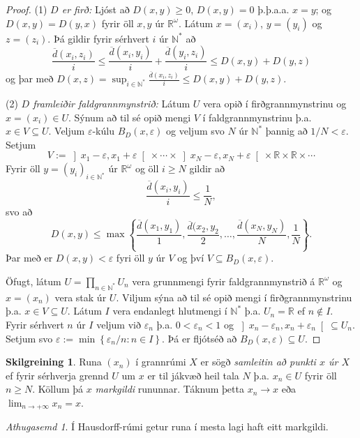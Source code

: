 \documentclass[a4paper,icelandic]{book}
\theoremstyle{definition}
\newtheorem{skilgr}{Skilgreining}[section]
\theoremstyle{plain}
\theoremstyle{remark}
\newtheorem*{ath}{Athugasemd}
\newcommand{\R}{\mathbb{R}} %
\newcommand{\N}{\mathbb{N}} %
\begin{document}
\begin{proof}
  (1) \emph{$D$ er firð:} Ljóst að $D(x,y)\geq 0$, $D(x,y)=0$ þ.þ.a.a.
  $x= y$; og $D(x,y) = D(y,x)$ fyrir öll $x,y$ úr $\R^\omega$. Látum $x =
  (x_i)$, $y=(y_i)$ og $z=(z_i)$. Þá gildir fyrir sérhvert $i$ úr $\N^*$ að\[
  \frac{\overline d(x_i,z_i)}{i}
  \leq \frac{\overline d(x_i,y_i)}{i} + \frac{\overline d(y_i,z_i)}{i}
  \leq D(x,y)+D(y,z)
  \]
  og þar með $D(x,z) = \sup_{i\in\N^*}\frac{\overline d(x_i,z_i)}{i}\leq
  D(x,y)+D(y,z)$.

  (2) \emph{$D$ framleiðir faldgrannmynstrið:} Látum $U$ vera opið í
  firðgrannmynstrinu og $x=(x_i)\in U$. Sýnum að til sé opið mengi $V$ í
  faldgrannmynstrinu þ.a. $x\in V\subseteq U$. Veljum $\varepsilon$-kúlu
  $B_D(x,\varepsilon)$ og veljum svo $N$ úr $\N^*$ þannig að $1/N<\varepsilon$.
  Setjum \[
  V := \left] x_1-\varepsilon,x_1+\varepsilon \right[\times\cdots\times\left]
  x_N-\varepsilon,x_N+\varepsilon \right[\times\R\times\R\times\cdots
  \]
  Fyrir öll $y = (y_i)_{i\in\N^*}$ úr $\R^\omega$ og öll $i\geq N$ gildir að
  \[
  \frac{\overline d(x_i,y_i)}{i}\leq \frac 1N,
  \]
  svo að\[
  D(x,y) \leq\max\left\{ \frac{\overline d(x_1,y_1)}{1}, \frac{\overline
  d(x_2,y_2}{2},\dots,\frac{\overline d(x_N,y_N)}{N}, \frac{1}{N} \right\}.
  \]
  Þar með er $D(x,y)<\varepsilon$ fyri öll $y$ úr $V$ og því $V\subseteq
  B_D(x,\varepsilon)$.

  Öfugt, látum $U = \prod_{n\in\N^*}U_n$ vera grunnmengi fyrir faldgrannmynstrið
  á $\R^\omega$ og $x = (x_n)$ vera stak úr $U$. Viljum sýna að til sé opið
  mengi í firðgrannmynstrinu þ.a. $x\in V\subseteq U$. Látum $I$ vera endanlegt
  hlutmengi í $\N^*$ þ.a. $U_n = \R$ ef $n\notin I$. Fyrir sérhvert $n$ úr
  $I$ veljum við $\varepsilon_n$ þ.a. $0<\varepsilon_n<1$ og 
  $\left] x_n-\varepsilon_n,x_n+\varepsilon_n \right[\subseteq U_n$. Setjum svo
  $\varepsilon := \min\left\{ \varepsilon_n/n : n\in I \right\}$. Þá er fljótséð
  að $B_D(x,\varepsilon)\subseteq U$.
\end{proof}
\begin{skilgr}
  Runa $(x_n)$ í grannrúmi $X$ er sögð \emph{samleitin að
  punkti $x$ úr $X$} ef fyrir sérhverja grennd
  $U$ um $x$ er til jákvæð heil tala $N$ þ.a. $x_n\in U$ fyrir öll $n\geq N$.
  Köllum þá $x$ \emph{markgildi} rununnar. Táknum þetta
  $x_n\longrightarrow x$ eða $\lim_{n\to+\infty}x_n = x$.
\end{skilgr}
\begin{ath}
  Í Hausdorff-rúmi getur runa í mesta lagi haft eitt markgildi.
\end{ath}
\end{document}
